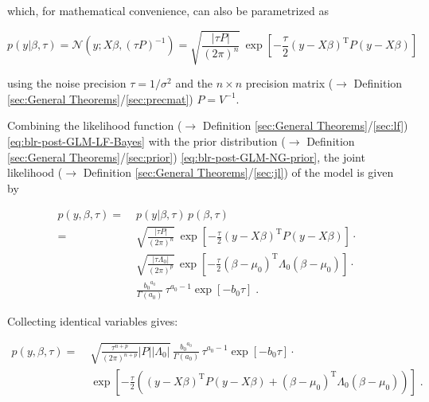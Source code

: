 \documentclass[a4paper,12pt,twoside]{book}
\begin{document}
which, for mathematical convenience, can also be parametrized as

\begin{equation} \label{eq:blr-post-GLM-LF-Bayes}
p(y|\beta,\tau) = \mathcal{N}(y; X \beta, (\tau P)^{-1}) = \sqrt{\frac{|\tau P|}{(2 \pi)^n}} \, \exp\left[ -\frac{\tau}{2} (y-X\beta)^\mathrm{T} P (y-X\beta) \right]
\end{equation}

using the noise precision $\tau = 1/\sigma^2$ and the $n \times n$ precision matrix ($\rightarrow$ Definition \ref{sec:General Theorems}/\ref{sec:precmat}) $P = V^{-1}$.

\vspace{1em}
Combining the likelihood function ($\rightarrow$ Definition \ref{sec:General Theorems}/\ref{sec:lf}) \eqref{eq:blr-post-GLM-LF-Bayes} with the prior distribution ($\rightarrow$ Definition \ref{sec:General Theorems}/\ref{sec:prior}) \eqref{eq:blr-post-GLM-NG-prior}, the joint likelihood ($\rightarrow$ Definition \ref{sec:General Theorems}/\ref{sec:jl}) of the model is given by

\begin{equation} \label{eq:blr-post-GLM-NG-JL-s1}
\begin{split}
p(y,\beta,\tau) = \; & p(y|\beta,\tau) \, p(\beta,\tau) \\
= \; & \sqrt{\frac{|\tau P|}{(2 \pi)^n}} \, \exp\left[ -\frac{\tau}{2} (y-X\beta)^\mathrm{T} P (y-X\beta) \right] \cdot \\
& \sqrt{\frac{|\tau \Lambda_0|}{(2 \pi)^p}} \, \exp\left[ -\frac{\tau}{2} (\beta-\mu_0)^\mathrm{T} \Lambda_0 (\beta-\mu_0) \right] \cdot \\
& \frac{ {b_0}^{a_0}}{\Gamma(a_0)} \, \tau^{a_0-1} \exp[-b_0 \tau] \; .
\end{split}
\end{equation}

Collecting identical variables gives:

\begin{equation} \label{eq:blr-post-GLM-NG-JL-s2}
\begin{split}
p(y,\beta,\tau) = \; & \sqrt{\frac{\tau^{n+p}}{(2 \pi)^{n+p}} |P| |\Lambda_0|} \, \frac{ {b_0}^{a_0}}{\Gamma(a_0)} \, \tau^{a_0-1} \exp[-b_0 \tau] \cdot \\
& \exp\left[ -\frac{\tau}{2} \left( (y-X\beta)^\mathrm{T} P (y-X\beta) + (\beta-\mu_0)^\mathrm{T} \Lambda_0 (\beta-\mu_0) \right) \right] \; .
\end{split}
\end{equation}
\end{document}
